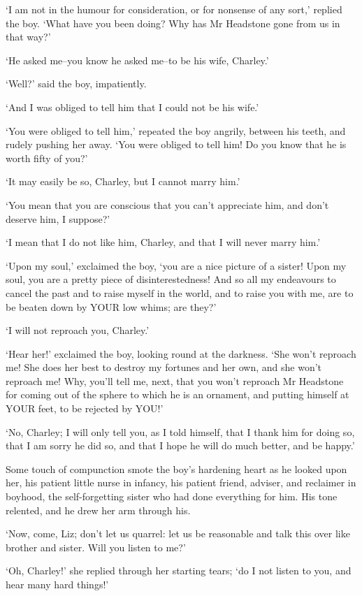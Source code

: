 ‘I am not in the humour for consideration, or for nonsense of any sort,’
replied the boy. ‘What have you been doing? Why has Mr Headstone gone
from us in that way?’

‘He asked me--you know he asked me--to be his wife, Charley.’

‘Well?’ said the boy, impatiently.

‘And I was obliged to tell him that I could not be his wife.’

‘You were obliged to tell him,’ repeated the boy angrily, between his
teeth, and rudely pushing her away. ‘You were obliged to tell him! Do
you know that he is worth fifty of you?’

‘It may easily be so, Charley, but I cannot marry him.’

‘You mean that you are conscious that you can’t appreciate him, and
don’t deserve him, I suppose?’

‘I mean that I do not like him, Charley, and that I will never marry
him.’

‘Upon my soul,’ exclaimed the boy, ‘you are a nice picture of a sister!
Upon my soul, you are a pretty piece of disinterestedness! And so all my
endeavours to cancel the past and to raise myself in the world, and to
raise you with me, are to be beaten down by YOUR low whims; are they?’

‘I will not reproach you, Charley.’

‘Hear her!’ exclaimed the boy, looking round at the darkness. ‘She won’t
reproach me! She does her best to destroy my fortunes and her own,
and she won’t reproach me! Why, you’ll tell me, next, that you won’t
reproach Mr Headstone for coming out of the sphere to which he is an
ornament, and putting himself at YOUR feet, to be rejected by YOU!’

‘No, Charley; I will only tell you, as I told himself, that I thank him
for doing so, that I am sorry he did so, and that I hope he will do much
better, and be happy.’

Some touch of compunction smote the boy’s hardening heart as he looked
upon her, his patient little nurse in infancy, his patient friend,
adviser, and reclaimer in boyhood, the self-forgetting sister who had
done everything for him. His tone relented, and he drew her arm through
his.

‘Now, come, Liz; don’t let us quarrel: let us be reasonable and talk
this over like brother and sister. Will you listen to me?’

‘Oh, Charley!’ she replied through her starting tears; ‘do I not listen
to you, and hear many hard things!’

